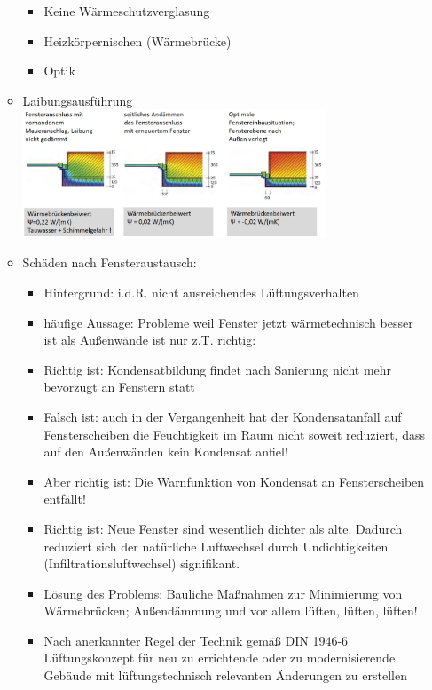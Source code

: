 \documentclass[fleqn,twoside,dvipsnames]{article}
\begin{document}
\begin{itemize}
\begin{itemize}
\begin{itemize}
                            \item Keine Wärmeschutzverglasung
                            \item Heizkörpernischen (Wärmebrücke)
                            \item Optik
                        \end{itemize}
                        \newpage
                    \item Laibungsausführung\\
                        \includegraphics[width=0.75\textwidth]{Grafiken/ES/Fensterlaibung.png}
                    \item Schäden nach Fensteraustausch:
                        \begin{itemize}
                            \item Hintergrund: i.d.R. nicht ausreichendes Lüftungsverhalten
                            \item häufige Aussage: Probleme weil Fenster jetzt wärmetechnisch besser ist als Außenwände ist nur z.T. richtig:
                            \item Richtig ist: Kondensatbildung findet nach Sanierung nicht mehr bevorzugt an Fenstern statt
                            \item Falsch ist: auch in der Vergangenheit hat der Kondensatanfall auf Fensterscheiben die Feuchtigkeit im Raum nicht soweit reduziert, dass auf den Außenwänden kein Kondensat anfiel!
                            \item Aber richtig ist: Die Warnfunktion von Kondensat an Fensterscheiben entfällt!
                            \item Richtig ist: Neue Fenster sind wesentlich dichter als alte. Dadurch reduziert sich der natürliche Luftwechsel durch Undichtigkeiten (Infiltrationsluftwechsel) signifikant.
                            \item Lösung des Problems: Bauliche Maßnahmen zur Minimierung von Wärmebrücken; Außendämmung und vor allem lüften, lüften, lüften!
                            \item Nach anerkannter Regel der Technik gemäß DIN 1946-6 Lüftungskonzept für neu zu errichtende oder zu modernisierende Gebäude mit lüftungstechnisch relevanten Änderungen zu erstellen

\end{itemize}
\end{itemize}
\end{itemize}
\end{document}

